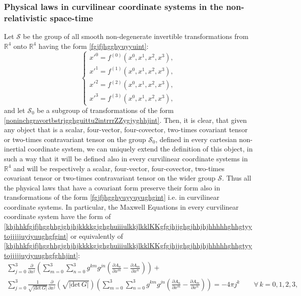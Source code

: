 \documentclass{article}
\theoremstyle{definition}
\theoremstyle{remark}
\newcommand{\er}{\eqref}
\newcommand{\er}{\eqref}
\begin{document}
\subsubsection{Physical laws in curvilinear coordinate systems in the
non-relativistic space-time}
Let $\mathcal{S}$ be the group of all smooth non-degenerate
invertible transformations from $\mathbb{R}^4$ onto $\mathbb{R}^4$
having the form \er{fgjfjhgghyuyyuint}:
\begin{equation}\label{fgjfjhgghyuyyuyughgint}
\begin{cases}
x'^0=f^{(0)}(x^0,x^1,x^2,x^3),\\
x'^1=f^{(1)}(x^0,x^1,x^2,x^3),\\
x'^2=f^{(2)}(x^0,x^1,x^2,x^3),\\
x'^3=f^{(3)}(x^0,x^1,x^2,x^3),
\end{cases}
\end{equation}
and let $\mathcal{S}_0$ be a subgroup of transformations of the form
\er{noninchgravortbstrjgghguittu2intrrrZZygjyghhjint}. Then, it is
clear, that given any object that is a scalar, four-vector,
four-covector, two-times covariant tensor or two-times contravariant
tensor on the group $\mathcal{S}_0$, defined in every cartesian
non-inertial coordinate system, we can uniquely extend the
definition of this object, in such a way that it will be defined
also in every curvilinear coordinate systems in $\mathbb{R}^4$ and
will be respectively a scalar, four-vector, four-covector, two-times
covariant tensor or two-times contravariant tensor on the wider
group $\mathcal{S}$. Thus all the physical laws that have a
covariant form preserve their form also in transformations of the
form \er{fgjfjhgghyuyyuyughgint} i.e. in curvilinear coordinate
systems. In particular, the Maxwell Equations in every curvilinear
coordinate system have the form of
\er{khjhhkfgjfjhgghhgjghjhjkkkkgjghghuiiiulkkjlkklKKgfgjhjjghgjhhjhjhhhhhghhgtyytojjjjjuyiyuughgfgint}
or equivalently of
\er{khjhhkfgjfjhgghhgjghjhjkkkkgjghghuiiiulkkjlkklKKgfgjhjjghgjhhjhjhhhhhghhgtyytojjjjjuyiyuughgfghhjint}:
\begin{multline}\label{khjhhkfgjfjhgghhgjghjhjkkkkgjghghuiiiulkkjlkklKKgfgjhjjghgjhhjhjhhhhhghhgtyytojjjjjuyiyuughgfghjjhkpkint}
\sum_{j=0}^{3}\frac{\partial}{\partial
x^j}\left(\sum_{m=0}^{3}\sum_{n=0}^{3}g^{km}g^{jn}\left(\frac{\partial
A_n}{\partial x^m}-\frac{\partial A_m}{\partial
x^n}\right)\right)+\\
\sum_{j=0}^{3}\frac{1}{\sqrt{|\text{det}\,G|}}\frac{\partial}{\partial
x^j}\left(\sqrt{|\text{det}\,G|}\right)\left(\sum_{m=0}^{3}\sum_{n=0}^{3}g^{km}g^{jn}\left(\frac{\partial
A_n}{\partial x^m}-\frac{\partial A_m}{\partial x^n}\right)\right)
=-4\pi j^k\quad\quad\forall\, k=0,1,2,3,
\end{multline}
\end{document}
